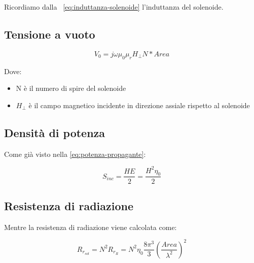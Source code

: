 			Ricordiamo dalla ~\ref{eq:induttanza-solenoide} l'induttanza del solenoide.

		 	\subsection{Tensione a vuoto}

				 \begin{equation}
				 V_0=j\omega\mu_0\mu_rH_{\perp}N*Area
				 \end{equation}

				 Dove:
				 \begin{itemize}
				 \item N è il numero di spire del solenoide 
				 \item $H_{\perp}$ è il campo magnetico incidente in direzione assiale rispetto al solenoide
				 \end{itemize}

			\subsection{Densità di potenza}
				Come già visto nella \ref{eq:potenza-propagante}:
			 	
			 	\begin{equation}
			 	S_{inc}=\frac{HE}{2}=\frac{H^2\eta_0}{2}
			 	\end{equation}

			\subsection{Resistenza di radiazione}
				 Mentre la resistenza di radiazione viene calcolata come:

				 \begin{equation}
				 R_{r_{sol}}=N^2R_{r_{R}}=N^2\eta_0\frac{8\pi^3}{3}(\frac{Area}{\lambda^2})^2
				 \end{equation}